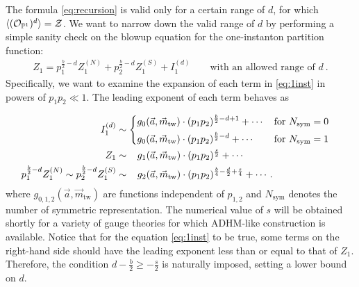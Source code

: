 \documentclass[letterpaper, 11pt]{article}
\newcommand{\nn}{\nonumber}
\def\IP{\mathbb{P}}
\def\CZ{{\cal Z}}
\begin{document}
The formula \eqref{eq:recursion} is valid only for a certain range of $d$, for which $\langle (\mathcal{O}_{\IP^1})^{d}\rangle = \CZ$. We want to narrow down the valid range of $d$ by performing a simple sanity check on the blowup equation for the one-instanton partition function:
\begin{align}
  \label{eq:1inst}
  Z_1 = p_1^{\frac{b}{2}-d}Z^{(N)}_1  + p_2^{\frac{b}{2}-d}  Z^{(S)}_1  + I_1^{(d)} \qquad \text{with an allowed range of $d$} \ .
\end{align}
Specifically, we want to examine the expansion of each term in \eqref{eq:1inst} in powers of $p_1p_2 \ll 1$. The  leading exponent of each term behaves as {\allowdisplaybreaks
\begin{align}
\begin{split}
  I_1^{(d)} &\sim \begin{dcases}
    g_0(\vec{a},  \vec{m}_{\text{tw}})\cdot  (p_1p_2)^{\frac{b}{2}-d + 1} + \cdots   &  \text{for }N_\text{sym} = 0\\
    g_0(\vec{a},  \vec{m}_{\text{tw}})\cdot (p_1p_2)^{\frac{b}{2}-d } + \cdots    &  \text{for }N_\text{sym} = 1
\end{dcases}
   \\
  Z_1 &\sim   \ \ \, g_1(\vec{a},  \vec{m}_{\text{tw}})\cdot (p_1p_2)^{\frac{s}{2}}  + \cdots   \\
  p_1^{\frac{b}{2}-d}Z_1^{(N)}\sim p_2^{\frac{b}{2}-d}  Z^{(S)}_1 &\sim  \ \ \,  g_2(\vec{a},  \vec{m}_{\text{tw}})\cdot  (p_1p_2)^{\frac{b}{4}-\frac{d}{2}+\frac{s}{4}}   + \cdots   .
  \end{split}
\end{align}
where $g_{0, 1, 2}(\vec{a}, \vec{m}_{\text{tw}})$ are functions independent of $p_{1, 2}$ and $N_{\text{sym}}$ denotes the number of symmetric representation. The numerical value of $s$ will be obtained shortly for a variety of gauge theories for which ADHM-like construction is available.
Notice that for the equation \eqref{eq:1inst} to be true, some terms on the right-hand side should have the leading exponent less than or equal to that of $Z_1$. Therefore, the condition $d - \frac{b}{2} \geq -\frac{s}{2}$ is naturally imposed, setting a lower bound on $d$. 

}
\end{document}
